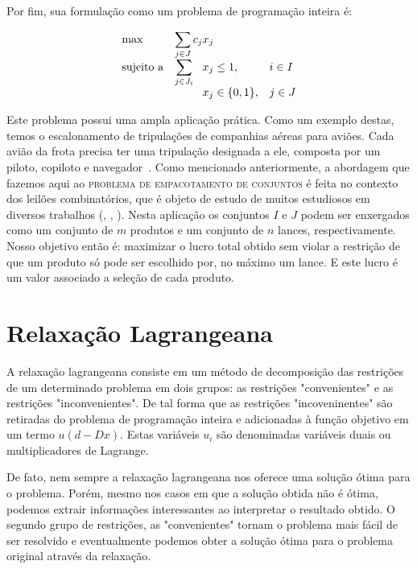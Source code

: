 \documentclass{article}
\begin{document}
	
	Por fim, sua formulação como um problema de programação inteira é:
	
	\begin{equation*}
        \begin{array}{ll@{}ll}
            \text{max}  & \displaystyle\sum\limits_{j \in J} c_{j}&x_{j} &\\
            \text{sujeito a}& \displaystyle\sum\limits_{j \in J_i}   &x_{j} \leq 1,  &i \in I\\
                 &                                                &x_{j} \in \{0,1\}, &j \in J
        \end{array}
    \end{equation*}
    
	Este problema possui uma ampla aplicação prática. Como um exemplo destas, temos o escalonamento de tripulações de companhias aéreas para aviões. Cada avião da frota precisa ter uma tripulação designada a ele, composta por um piloto, copiloto e navegador~\cite{Airline}.    
    Como mencionado anteriormente, a abordagem que fazemos aqui ao \textsc{problema de empacotamento de conjuntos} é feita no contexto dos leilões combinatórios, que é objeto de estudo de muitos estudiosos em diversos trabalhos (\cite{Winner}, \cite{Taming}, \cite{CABOB}). Nesta aplicação os conjuntos $I$ e $J$ podem ser enxergados como um conjunto de $m$ produtos e um conjunto de $n$ lances, respectivamente. Nosso objetivo então é: maximizar o lucro total obtido sem violar a restrição de que um produto só pode ser escolhido por, no máximo um lance. E este lucro é um valor associado a seleção de cada produto. 

	
	\section{Relaxação Lagrangeana}\label{sec:relag}
	A relaxação lagrangeana consiste em um método de decomposição das restrições de um determinado problema em dois grupos: as restrições "convenientes" e as restrições "inconvenientes". De tal forma que as restrições "incoveninentes" são retiradas do problema de programação inteira e adicionadas à função objetivo em um termo $u(d - Dx)$. Estas variáveis $u_i$ são denominadas variáveis duais ou multiplicadores de Lagrange.
	
	De fato, nem sempre a relaxação lagrangeana nos oferece uma solução ótima para o problema. Porém, mesmo nos casos em que a solução obtida não é ótima, podemos extrair informações interessantes ao interpretar o resultado obtido.
	O segundo grupo de restrições, as "convenientes" tornam o problema mais fácil de ser resolvido e eventualmente podemos obter a solução ótima para o problema original através da relaxação.
	
\end{document}
